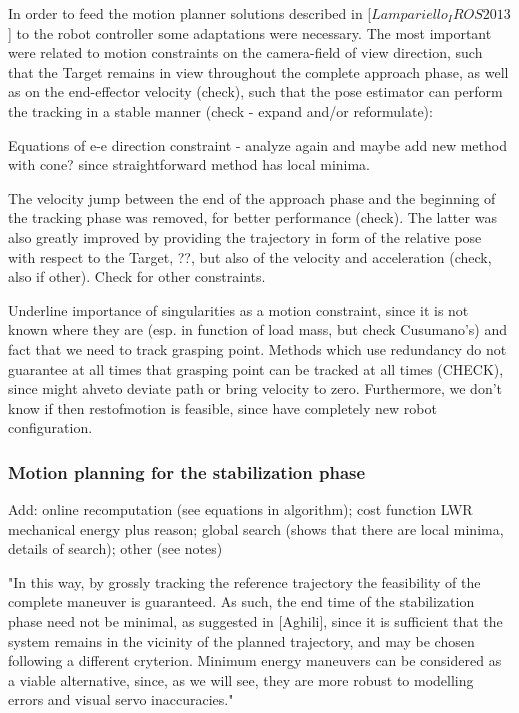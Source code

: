 In order to feed the motion planner solutions described in [$Lampariello_IROS2013$] to the robot controller some adaptations were necessary. The most important were related to motion constraints on the camera-field of view direction, such that the Target remains in view throughout the complete approach phase, as well as on the end-effector velocity (check), such that the pose estimator can perform the tracking in a stable manner (check - expand and/or reformulate):

Equations of e-e direction constraint - analyze again and maybe add new method with cone? since straightforward method has local minima.

The velocity jump between the end of the approach phase and the beginning of the tracking phase was removed, for better performance (check). The latter was also greatly improved by providing the trajectory in form of the relative pose with respect to the Target, ??, but also of the velocity and acceleration (check, also if other). Check for other constraints.

Underline importance of singularities as a motion constraint, since it is not known where they are (esp. in function of load mass, but check Cusumano's) and fact that we need to track grasping point. Methods which use redundancy do not guarantee at all times that grasping point can be tracked at all times (CHECK), since might ahveto deviate path or bring velocity to zero. Furthermore, we don't know if then restofmotion is feasible, since have completely new robot configuration.

\subsubsection{Motion planning for the stabilization phase}

Add: online recomputation (see equations in algorithm); cost function LWR mechanical energy plus reason; global search (shows that there are local minima, details of search); other (see notes)

"In this way, by grossly tracking the reference trajectory the feasibility of the complete maneuver is guaranteed. As such, the end time of the stabilization phase need not be minimal, as suggested in [Aghili], since it is sufficient that the system remains in the vicinity of the planned trajectory, and may be chosen following a different cryterion. Minimum energy maneuvers can be considered as a viable alternative, since, as we will see, they are more robust to modelling errors and visual servo inaccuracies."

